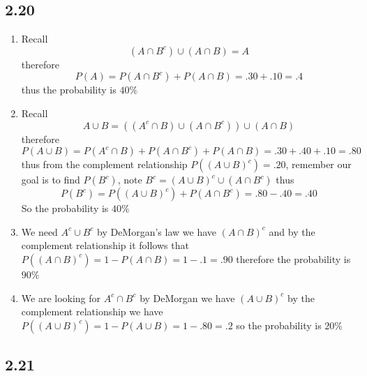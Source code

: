 \documentclass[11pt]{book}
\begin{document}

\subsection{2.20}%
\label{sub:2_20}

\begin{enumerate}[label=\alph*)]
    \item Recall 
        \[
            \left( A\cap B^{c}  \right) \cup \left( A\cap B \right) = A
        \]
        therefore 
        \[
            P\left(A\right) = P\left(A\cap B^{c} \right)  + P\left(A\cap B\right) = .30  + .10 = .4
        \]
        thus the probability is $40\%$ 
    \item Recall 
        \[
            A\cup B= \left( \left( A^{c} \cap B \right) \cup \left( A \cap B^{c}  \right)  \right)  \cup \left( A\cap B \right) 
        \]
        therefore 
        \[
        P\left(A\cup B\right) = P\left(A^{c} \cap B\right)  + P\left(A\cap B^{c} \right)  + P\left(A\cap B\right) = .30  + .40  + .10 = .80
        \]
        thus from the complement relationship $P\left(\left( A\cup B \right) ^{c} \right) = .20$, remember our goal is to find $P\left(B^{c} \right) $, note $B^{c} = \left( A\cup B \right) ^{c} \cup \left( A\cap B^{c}  \right) $ thus 
        \[
            P\left(B^{c} \right) = P\left(\left( A\cup B \right) ^{c} \right)  + P\left(A \cap B^{c} \right) = .80  - .40 = .40
        \]
        So the probability is $40\%$ 
    \item We need $A^{c} \cup B^{c} $ by DeMorgan's law we have $\left( A\cap B \right) ^{c} $ and by the complement relationship it follows that $P\left(\left( A\cap B \right) ^{c} \right) = 1  - P\left(A\cap B\right) = 1  - .1 = .90$ therefore the probability is $90\%$ 
    \item We are looking for $A^{c} \cap B^{c} $ by DeMorgan we have $\left( A\cup B \right) ^{c} $ by the complement relationship we have $P\left(\left( A\cup B \right) ^{c} \right) = 1 - P\left(A \cup B\right) = 1 - .80 = .2$ so the probability is $20\%$ 
\end{enumerate}


\subsection{2.21}%
\label{sub:2_21}
\end{document}
